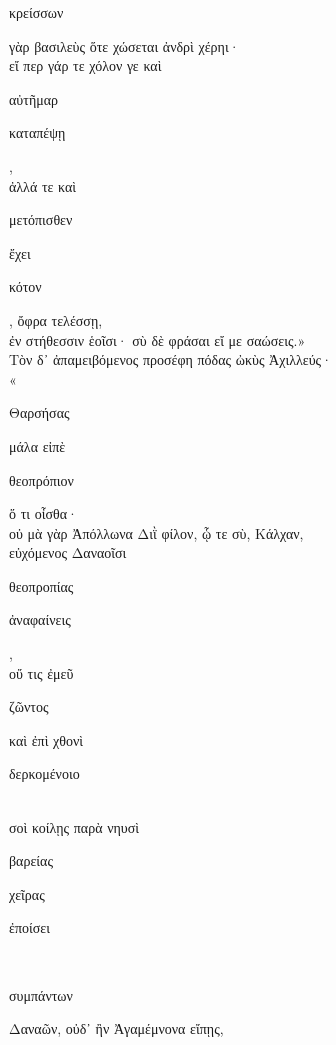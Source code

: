 \documentclass{ransom}
\begin{document}
\renewcommand{\rightheaderwhat}{\rightheaderwhatglosses}%
\begin{foreignpage}
\begin{graytext}
\begin{whitetext}κρείσσων\end{whitetext} γὰρ βασιλεὺς ὅτε χώσεται ἀνδρὶ χέρηι·\hfill{}\\
εἴ περ γάρ τε χόλον γε καὶ \begin{whitetext}αὐτῆμαρ\end{whitetext} \begin{whitetext}καταπέψῃ\end{whitetext},\\
ἀλλά τε καὶ \begin{whitetext}μετόπισθεν\end{whitetext} ἔχει \begin{whitetext}κότον\end{whitetext}, ὄφρα τελέσσῃ,\\
ἐν στήθεσσιν ἑοῖσι· σὺ δὲ φράσαι εἴ με σαώσεις.»\\
Τὸν δ᾽ ἀπαμειβόμενος προσέφη πόδας ὠκὺς Ἀχιλλεύς·\\
«\begin{whitetext}Θαρσήσας\end{whitetext} μάλα εἰπὲ \begin{whitetext}θεοπρόπιον\end{whitetext} ὅ τι οἶσθα·\hfill{}\\
οὐ μὰ γὰρ Ἀπόλλωνα Διῒ φίλον, ᾧ τε σὺ, Κάλχαν,\\
εὐχόμενος Δαναοῖσι \begin{whitetext}θεοπροπίας\end{whitetext} \begin{whitetext}ἀναφαίνεις\end{whitetext},\\
οὔ τις ἐμεῦ \begin{whitetext}ζῶντος\end{whitetext} καὶ ἐπὶ χθονὶ \begin{whitetext}δερκομένοιο\end{whitetext}\\
σοὶ κοίλῃς παρὰ νηυσὶ \begin{whitetext}βαρείας\end{whitetext} χεῖρας \begin{whitetext}ἐποίσει\end{whitetext}\\
\begin{whitetext}συμπάντων\end{whitetext} Δαναῶν, οὐδ᾽ ἢν Ἀγαμέμνονα εἴπῃς,\hfill{}\\

\end{graytext}
\end{foreignpage}
\end{document}
